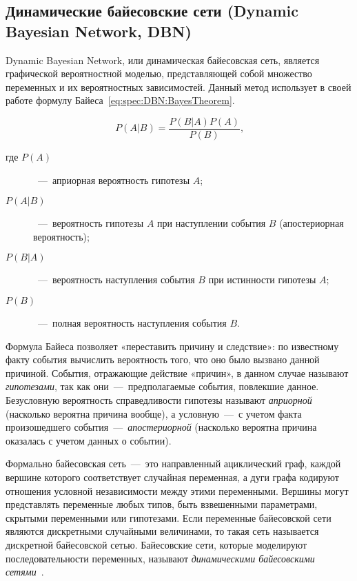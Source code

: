 \subsection{Динамические байесовские сети (Dynamic Bayesian Network, DBN)}
Dynamic Bayesian Network, или динамическая байесовская сеть, является графической вероятностной моделью, представляющей собой множество переменных и их вероятностных зависимостей. Данный метод использует в своей работе формулу Байеса~\eqref{eq:spec:DBN:BayesTheorem}.

\begin{equation} \label{eq:spec:DBN:BayesTheorem}
P(A|B) = \frac{P(B|A) P(A)}{P(B)} \text{,}
\end{equation}
\begin{description}
	\item[где $P(A)$]~---~априорная вероятность гипотезы $A$;
	\item[$P(A|B)$]~---~вероятность гипотезы $A$ при наступлении события $B$ (апостериорная вероятность);
	\item[$P(B|A)$]~---~вероятность наступления события $B$ при истинности гипотезы $A$;
	\item[$P(B)$]~---~полная вероятность наступления события $B$.
\end{description}

Формула Байеса позволяет «переставить причину и следствие»: по известному факту события вычислить вероятность того, что оно было вызвано данной причиной. События, отражающие действие «причин», в данном случае называют \textit{гипотезами}, так как они~---~предполагаемые события, повлекшие данное. Безусловную вероятность справедливости гипотезы называют \textit{априорной} (насколько вероятна причина вообще), а условную~---~с учетом факта произошедшего события~---~\textit{апостериорной} (насколько вероятна причина оказалась с учетом данных о событии).

Формально байесовская сеть~---~это направленный ациклический граф, каждой вершине которого соответствует случайная переменная, а дуги графа кодируют отношения условной независимости между этими переменными. Вершины могут представлять переменные любых типов, быть взвешенными параметрами, скрытыми переменными или гипотезами. Если переменные байесовской сети являются дискретными случайными величинами, то такая сеть называется дискретной байесовской сетью. Байесовские сети, которые моделируют последовательности переменных, называют \textit{динамическими байесовскими сетями}~\cite{PearlDynamicBayesianNetworks}.

